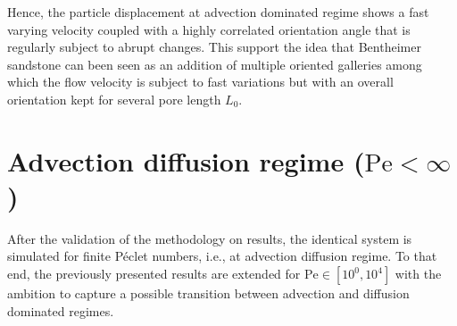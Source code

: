 Hence, the particle displacement at advection dominated regime shows a fast varying velocity coupled with a highly correlated orientation angle that is regularly subject to abrupt changes.
This support the idea that Bentheimer sandstone can been seen as an addition of multiple oriented galleries among which the flow velocity is subject to fast variations but with an overall orientation kept for several pore length $L_0$.

\chapter{Advection diffusion regime ($\mathrm{Pe}<\infty$)}
After the validation of the methodology on \citet{Meyer2016} results, the identical system is simulated for finite Péclet numbers, i.e., at advection diffusion regime. 
To that end, the previously presented results are extended for $\mathrm{Pe}\in[10^{0},10^{4}]$ with the ambition to capture a possible transition between advection and diffusion dominated regimes.
